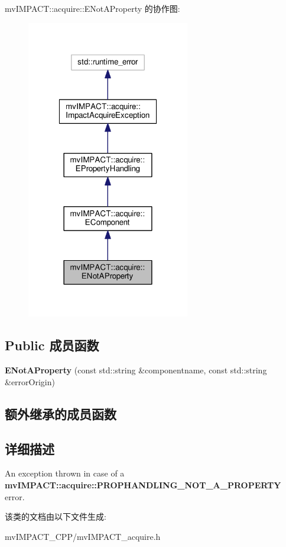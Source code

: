 mv\+I\+M\+P\+A\+C\+T\+:\+:acquire\+:\+:E\+Not\+A\+Property 的协作图\+:
\nopagebreak
\begin{figure}[H]
\begin{center}
\leavevmode
\includegraphics[width=202pt]{classmv_i_m_p_a_c_t_1_1acquire_1_1_e_not_a_property__coll__graph}
\end{center}
\end{figure}
\subsection*{Public 成员函数}
\begin{DoxyCompactItemize}
\item 
\hypertarget{classmv_i_m_p_a_c_t_1_1acquire_1_1_e_not_a_property_aa4cd698f87557cdc3853d70e75302bb5}{{\bfseries E\+Not\+A\+Property} (const std\+::string \&componentname, const std\+::string \&error\+Origin)}\label{classmv_i_m_p_a_c_t_1_1acquire_1_1_e_not_a_property_aa4cd698f87557cdc3853d70e75302bb5}

\end{DoxyCompactItemize}
\subsection*{额外继承的成员函数}


\subsection{详细描述}
An exception thrown in case of a {\bfseries mv\+I\+M\+P\+A\+C\+T\+::acquire\+::\+P\+R\+O\+P\+H\+A\+N\+D\+L\+I\+N\+G\+\_\+\+N\+O\+T\+\_\+\+A\+\_\+\+P\+R\+O\+P\+E\+R\+T\+Y} error. 

该类的文档由以下文件生成\+:\begin{DoxyCompactItemize}
\item 
mv\+I\+M\+P\+A\+C\+T\+\_\+\+C\+P\+P/mv\+I\+M\+P\+A\+C\+T\+\_\+acquire.\+h\end{DoxyCompactItemize}
